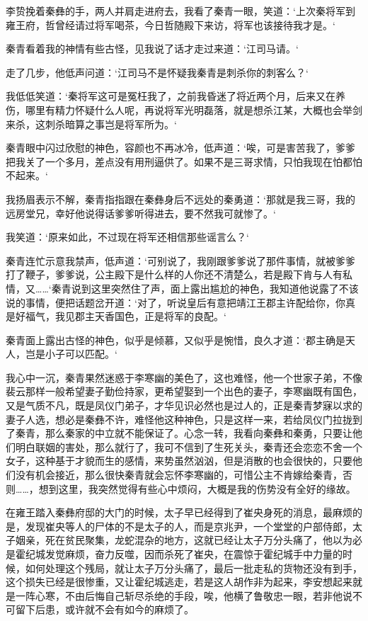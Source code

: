 李贽挽着秦彝的手，两人并肩走进府去，我看了秦青一眼，笑道：‘上次秦将军到雍王府，哲曾经请过将军喝茶，今日哲随殿下来访，将军也该接待我才是。‘

秦青看着我的神情有些古怪，见我说了话才走过来道：‘江司马请。‘

走了几步，他低声问道：‘江司马不是怀疑我秦青是刺杀你的刺客么？‘

我低低笑道：‘秦将军这可是冤枉我了，之前我昏迷了将近两个月，后来又在养伤，哪里有精力怀疑什么人呢，再说将军光明磊落，就是想杀江某，大概也会举剑来杀，这刺杀暗算之事岂是将军所为。‘

秦青眼中闪过欣慰的神色，容颜也不再冰冷，低声道：‘唉，可是害苦我了，爹爹把我关了一个多月，差点没有用刑逼供了。如果不是三哥求情，只怕我现在怕都怕不起来。‘

我扬眉表示不解，秦青指指跟在秦彝身后不远处的秦勇道：‘那就是我三哥，我的远房堂兄，幸好他说得话爹爹听得进去，要不然我可就惨了。‘

我笑道：‘原来如此，不过现在将军还相信那些谣言么？‘

秦青连忙示意我禁声，低声道：‘可别说了，我刚跟爹爹说了那件事情，就被爹爹打了鞭子，爹爹说，公主殿下是什么样的人你还不清楚么，若是殿下肯与人有私情，又……‘秦青说到这里突然住了声，面上露出尴尬的神色，我知道他说露了不该说的事情，便把话题岔开道：‘对了，听说皇后有意把靖江王郡主许配给你，你真是好福气，我见郡主天香国色，正是将军的良配。‘

秦青面上露出古怪的神色，似乎是倾慕，又似乎是惋惜，良久才道：‘郡主确是天人，岂是小子可以匹配。‘

我心中一沉，秦青果然迷惑于李寒幽的美色了，这也难怪，他一个世家子弟，不像裴云那样一般希望妻子勤俭持家，更希望娶到一个出色的妻子，李寒幽既有国色，又是气质不凡，既是凤仪门弟子，才华见识必然也是过人的，正是秦青梦寐以求的妻子人选，想必是秦彝不许，难怪他这种神色，只是这样一来，若给凤仪门拉拢到了秦青，那么秦家的中立就不能保证了。心念一转，我看向秦彝和秦勇，只要让他们明白联姻的害处，那么就行了，我可不信到了生死关头，秦青还会恋恋不舍一个女子，这种基于才貌而生的感情，来势虽然汹汹，但是消散的也会很快的，只要他们没有机会接近，那么很快秦青就会忘怀李寒幽的，可惜公主不肯嫁给秦青，否则……，想到这里，我突然觉得有些心中烦闷，大概是我的伤势没有全好的缘故。

在雍王踏入秦彝府邸的大门的时候，太子早已经得到了崔央身死的消息，最麻烦的是，发现崔央等人的尸体的不是太子的人，而是京兆尹，一个堂堂的户部侍郎，太子姻亲，死在贫民聚集，龙蛇混杂的地方，这就已经让太子万分头痛了，他以为必是霍纪城发觉麻烦，奋力反噬，因而杀死了崔央，在震惊于霍纪城手中力量的时候，如何处理这个残局，就让太子万分头痛了，最后一批走私的货物还没有到手，这个损失已经是很惨重，又让霍纪城逃走，若是这人胡作非为起来，李安想起来就是一阵心寒，不由后悔自己斩尽杀绝的手段，唉，他横了鲁敬忠一眼，若非他说不可留下后患，或许就不会有如今的麻烦了。

